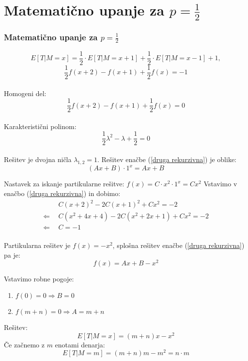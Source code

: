\documentclass[10pt]{beamer}
\begin{document}
\section[Matematično upanje za $p = \frac{1}{2}$]{Matematično upanje za $p = \frac{1}{2}$}
\begin{frame}
\frametitle{Matematično upanje za $p = \frac{1}{2}$}
$$E[T|M=x] = \frac{1}{2}\cdot E[T|M=x+1] + \frac{1}{2}\cdot E[T|M=x-1] + 1,$$
\begin{equation}
\label{druga rekurzivna}
\frac{1}{2}f(x+2)-f(x+1)+\frac{1}{2}f(x)=-1
\end{equation}\\
Homogeni del:\\
$$\frac{1}{2}f(x+2)-f(x+1)+\frac{1}{2}f(x)=0$$\\
Karakteristični polinom:
\begin{equation}
\label{druga homogena}
\frac{1}{2}\lambda^2-\lambda+\frac{1}{2}=0
\end{equation} \\
Rešitev je dvojna ničla $\lambda_{1, 2}= 1$. Rešitev enačbe (\ref{druga rekurzivna}) je oblike:\\ $$(Ax+B)\cdot 1^x=Ax+B$$
\end{frame}

\begin{frame}
Nastavek za iskanje partikularne rešitve: $f(x)=C\cdot x^2\cdot 1^x= Cx^2$
 Vstavimo v enačbo (\ref{druga rekurzivna}) in dobimo:
\begin{equation*}
\begin{split}
 & ~~C(x+2)^2-2C(x+1)^2+Cx^2=-2\\
\Leftarrow & ~~C(x^2+4x+4)-2C(x^2+2x+1)+Cx^2=-2\\
\Leftarrow &  ~~C = -1 \\
\end{split}
\end{equation*}

Partikularna rešitev je $f(x)=-x^2$, splošna rešitev enačbe (\ref{druga rekurzivna}) pa je: $$f(x)=Ax+B-x^2$$

Vstavimo robne pogoje:
\begin{enumerate}
\item $f(0)=0\Rightarrow B = 0$
\item $f(m+n)=0 \Rightarrow A = m+n$
\end{enumerate}
Rešitev: $$E[T|M=x]= (m+n)x-x^2$$
Če začnemo z $m$ enotami denarja:$$E[T|M=m]=(m+n)m-m^2= n\cdot m$$
\end{frame}
\end{document}
